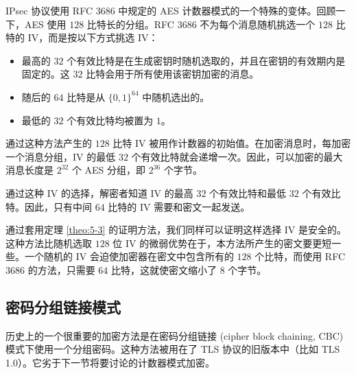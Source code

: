 IPsec 协议使用 RFC 3686 中规定的 AES 计数器模式的一个特殊的变体。回顾一下，AES 使用 $128$ 比特长的分组。RFC 3686 不为每个消息随机挑选一个 $128$ 比特的 IV，而是按以下方式挑选 IV：
\begin{itemize}
	\item 最高的 $32$ 个有效比特是在生成密钥时随机选取的，并且在密钥的有效期内是固定的。这 $32$ 比特会用于所有使用该密钥加密的消息。
	\item 随后的 $64$ 比特是从 $\{0,1\}^{64}$ 中随机选出的。
	\item 最低的 $32$ 个有效比特均被置为 $1$。
\end{itemize}
通过这种方法产生的 $128$ 比特 IV 被用作计数器的初始值。在加密消息时，每加密一个消息分组，IV 的最低 $32$ 个有效比特就会递增一次。因此，可以加密的最大消息长度是 $2^{32}$ 个 AES 分组，即 $2^{36}$ 个字节。

通过这种 IV 的选择，解密者知道 IV 的最高 $32$ 个有效比特和最低 $32$ 个有效比特。因此，只有中间 $64$ 比特的 IV 需要和密文一起发送。

通过套用定理 \ref{theo:5-3} 的证明方法，我们同样可以证明这样选择 IV 是安全的。这种方法比随机选取 $128$ 位 IV 的微弱优势在于，本方法所产生的密文要更短一些。一个随机的 IV 会迫使加密器在密文中包含所有的 $128$ 个比特，而使用 RFC 3686 的方法，只需要 $64$ 比特，这就使密文缩小了 $8$ 个字节。

\subsection{密码分组链接模式}\label{subsec:5-4-3}

历史上的一个很重要的加密方法是在密码分组链接 (cipher block chaining, CBC) 模式下使用一个分组密码。这种方法被用在了 TLS 协议的旧版本中（比如 TLS 1.0）。它劣于下一节将要讨论的计数器模式加密。

